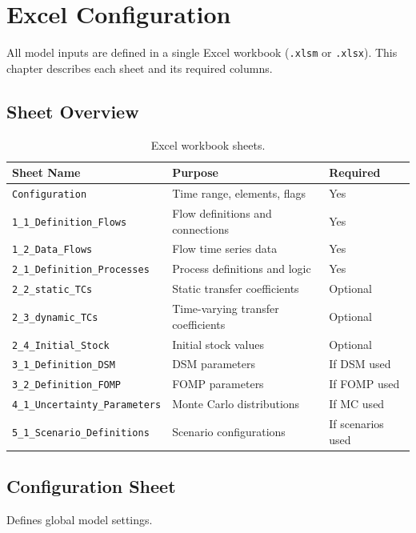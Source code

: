 \chapter{Excel Configuration}
\label{ch:excel}

All model inputs are defined in a single Excel workbook (\texttt{.xlsm} or \texttt{.xlsx}). This chapter describes each sheet and its required columns.

\section{Sheet Overview}

\begin{table}[h]
\centering
\begin{tabular}{lll}
\toprule
\textbf{Sheet Name} & \textbf{Purpose} & \textbf{Required} \\
\midrule
\texttt{Configuration} & Time range, elements, flags & Yes \\
\texttt{1\_1\_Definition\_Flows} & Flow definitions and connections & Yes \\
\texttt{1\_2\_Data\_Flows} & Flow time series data & Yes \\
\texttt{2\_1\_Definition\_Processes} & Process definitions and logic & Yes \\
\texttt{2\_2\_static\_TCs} & Static transfer coefficients & Optional \\
\texttt{2\_3\_dynamic\_TCs} & Time-varying transfer coefficients & Optional \\
\texttt{2\_4\_Initial\_Stock} & Initial stock values & Optional \\
\texttt{3\_1\_Definition\_DSM} & DSM parameters & If DSM used \\
\texttt{3\_2\_Definition\_FOMP} & FOMP parameters & If FOMP used \\
\texttt{4\_1\_Uncertainty\_Parameters} & Monte Carlo distributions & If MC used \\
\texttt{5\_1\_Scenario\_Definitions} & Scenario configurations & If scenarios used \\
\bottomrule
\end{tabular}
\caption{Excel workbook sheets.}
\label{tab:sheets}
\end{table}

\section{Configuration Sheet}

Defines global model settings.

